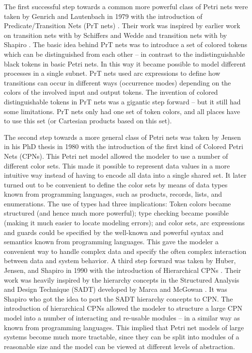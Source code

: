 The first successful step towards a common more powerful class of
Petri nets were taken by Genrich and Lautenbach in 1979 with the
introduction of Predicate/Transition Nets (PrT nets)
\cite{genrich:81}. Their work was inspired by earlier work on
transition nets with  by Schiffers and Wedde
\cite{schiffers:78} and transition nets with  by Shapiro \cite{shapiro:78}. The basic idea behind PrT
nets was to introduce a set of colored tokens which can be
distinguished from each other -- in contrast to the indistinguishable
black tokens in basic Petri nets. In this way it became possible to
model different processes in a single subnet. PrT nets used arc
expressions to define how transitions can occur in different ways
(occurrence modes) depending on the colors of the involved input and
output tokens. The invention of colored distinguishable tokens in PrT
nets was a gigantic step forward -- but it still had some
limitations. PrT nets only had one set of token colors, and all places
have to use this set (or Cartesian products based on this set).

The second step towards a more general class of Petri nets was taken
by Jensen in his PhD thesis in 1980 \cite{jensen:81} with the
introduction of the first kind of Colored Petri Nets (CPNs). This
Petri net model allowed the modeler to use a number of different color
sets. This made it possible to represent data values in a more
intuitive way instead of having to encode all data into a single
shared set. It later turned out to be convenient to define the color
sets by means of data types known from programming languages, such as
products, records, lists, and enumerations. The use of types had three
implications: Token colors became structured (and hence much more
powerful); type checking became possible (making it much easier to
locate modeling errors); and color sets, arc expressions and guards
could be specified by the well-known and powerful syntax and semantics
known from programming languages. This gave the modeler a convenient
way to handle complex data and specify the often complex interaction
between data and system behavior. A third step forward was taken by
Huber, Jensen, and Shapiro in 1990 with the introduction of
Hierarchical CPNs \cite{huber:91}. Their work was heavily inspired by
the hierarchy concepts in the Structured Analysis and Design Technique
(SADT) developed by Marca and McGowan \cite{sadt}. It was Shapiro who got
the idea to port the SADT hierarchy concepts to CPN.  The introduction
of hierarchical CPNs allowed the modeler to structure a large CPN
model into a number of interacting and re-usable modules -- in a
similar way as known from programming languages. This implied that
Petri net models of large systems become much more tractable, since
they can be split into modules of a reasonable size and the model can
be viewed at different levels of abstraction.


